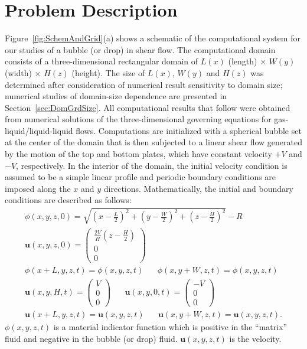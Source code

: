 \documentclass[%
 reprint,
 showkeys,
 amsmath,amssymb,
 aps,
 prfluids,
 onecolumn
]{revtex4-2}
\newcommand{\vv}{\mathbf}
\newcommand{\bmu}{\vv{u}}
\begin{document}
\section{Problem Description}

Figure~\ref{fig:SchemAndGrid}(a) shows a schematic of the computational system
for our studies of a bubble (or drop) in shear flow.  The computational domain
consists of a three-dimensional rectangular domain of $L(x)$ (length) $\times$
$W(y)$ (width) $\times$ $H(z)$ (height).  The size of $L(x)$, $W(y)$ and $H(z)$
was determined after consideration of numerical result sensitivity to domain
size; numerical studies of domain-size dependence are presented in
Section~\ref{sec:DomGrdSize}.  All computational results that follow were
obtained from numerical solutions of the three-dimensional governing equations
for gas-liquid/liquid-liquid flows.  Computations are initialized with a
spherical bubble set at the center of the domain that is then subjected to a
linear shear flow generated by the motion of the top and bottom plates, which 
have constant velocity $+V$ and $-V$, respectively.  In the interior of the
domain, the initial velocity condition is assumed to be a simple linear profile
and periodic boundary conditions are imposed along the $x$ and $y$ directions.
Mathematically, the initial and boundary conditions are described as
follows:
\begin{eqnarray}
	\phi(x,y,z,0)=\sqrt{(x-\frac{L}{2})^{2}+(y-\frac{W}{2})^{2}+
	(z-\frac{H}{2})^{2}}-R \label{IC_BC} \\
	\bmu(x,y,z,0)=\left( \begin{array}{c}
		\frac{2V}{H}(z-\frac{H}{2}) \\ 0 \\ 0 
	\end{array} \right) \nonumber \\
	\phi(x+L,y,z,t)=\phi(x,y,z,t) \hspace{20pt}
	\phi(x,y+W,z,t)=\phi(x,y,z,t) \nonumber \\
	\bmu(x,y,H,t)=\left( \begin{array}{c}
		                V \\ 0 \\ 0 
	\end{array} \right)  \hspace{20pt}
	\bmu(x,y,0,t)=\left( \begin{array}{c}
		                -V \\ 0 \\ 0 
	\end{array} \right)  \nonumber \\
	\bmu(x+L,y,z,t)=\bmu(x,y,z,t) \hspace{20pt} 
	\bmu(x,y+W,z,t)=\bmu(x,y,z,t). \nonumber
\end{eqnarray}
$\phi(x,y,z,t)$ is a material indicator function which is positive 
in the ``matrix'' fluid and negative in the bubble (or drop) fluid.
$\bmu(x,y,z,t)$ is the velocity.
\end{document}

